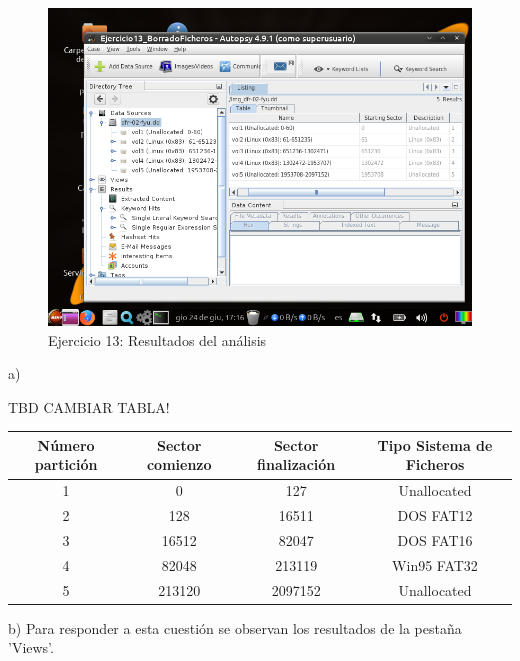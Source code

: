 \documentclass[11pt]{article}
\begin{document}
\begin{figure}[H]
    \caption{Ejercicio 13: Resultados del análisis}
    \centering
    \includegraphics[scale=0.7]{e13-5.png}
\end{figure}

a)

TBD CAMBIAR TABLA!
\begin{table}[H]
    \centering
    \begin{tabular}{|c|c|c|c|}
        \hline
        Número partición & Sector comienzo & Sector finalización & Tipo Sistema de Ficheros \\
        \hline\hline
        1 & 0 & 127 & Unallocated \\
        \hline
        2 & 128 & 16511 & DOS FAT12 \\
        \hline
        3 & 16512 & 82047 & DOS FAT16 \\
        \hline
        4 & 82048 & 213119 & Win95 FAT32 \\
        \hline
        5 & 213120 & 2097152 & Unallocated \\
        \hline
    \end{tabular}
\end{table}

b) Para responder a esta cuestión se observan los resultados de la pestaña 'Views'.
\end{document}
